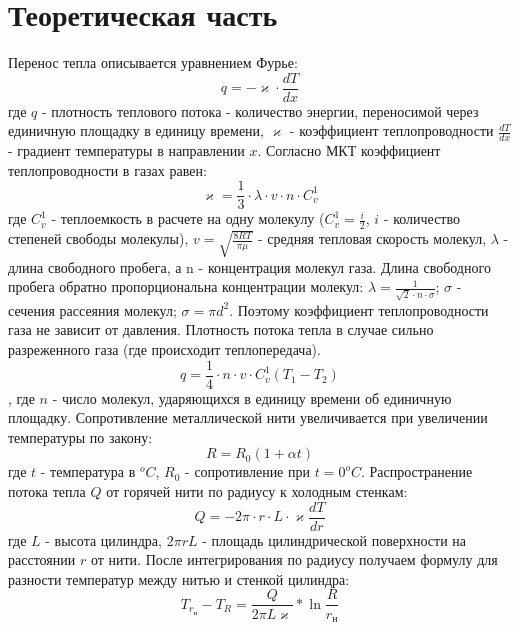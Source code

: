 \documentclass[a4paper]{article}
\begin{document}
	\section{Теоретическая часть}
	Перенос тепла описывается уравнением Фурье:
	\begin{equation}
	q=-\varkappa \cdot \frac{dT}{dx}
	\end{equation}
	где $q$ - плотность теплового потока - количество энергии, переносимой через единичную площадку в единицу времени, $\varkappa$ - коэффициент теплопроводности $\frac{dT}{dx}$ - градиент температуры в направлении $x$. Согласно МКТ коэффициент теплопроводности в газах равен:
	\begin{equation}
	\varkappa=\frac{1}{3}\cdot \lambda \cdot v \cdot n \cdot C^1_v
	\end{equation}
	где $C^1_v$ - теплоемкость в расчете на одну молекулу ($C^1_v=\frac{i}{2}$, $i$ - количество степеней свободы молекулы), $v=\sqrt{\frac{8RT}{\pi \mu}}$ - средняя тепловая скорость молекул, $\lambda$ - длина свободного пробега, а n - концентрация молекул газа. Длина свободного пробега обратно пропорциональна концентрации молекул: 
	$\lambda=\frac{1}{\sqrt{2}\cdot n \cdot \sigma}$; $\sigma$ - сечения рассеяния молекул; $\sigma=\pi d^2$. Поэтому коэффициент теплопроводности газа не зависит от давления.
	Плотность потока тепла в случае сильно разреженного газа (где происходит теплопередача).
	\begin{equation}
	q=\frac{1}{4}\cdot n \cdot v \cdot C^1_v(T_1-T_2)
	\end{equation},
	где $n$ - число молекул, ударяющихся в единицу времени об единичную площадку.
	Сопротивление металлической нити увеличивается при увеличении температуры по закону:
	\begin{equation}
	R=R_0(1 + \alpha t)
	\end{equation}
	где $t$ - температура в $^oC$, $R_0$ - сопротивление при $t=0^oC$.
	Распространение потока тепла $Q$ от горячей нити по радиусу к холодным стенкам:
	\begin{equation}
	Q=-2\pi \cdot r \cdot L \cdot \varkappa \frac{dT}{dr}
	\end{equation}
	где $L$ - высота цилиндра, $2\pi r L$ - площадь цилиндрической поверхности на расстоянии $r$ от нити. После интегрирования по радиусу получаем формулу для разности температур между нитью и стенкой цилиндра:
	\begin{equation}
	T_{r_\text{н}} - T_R=\frac{Q}{2\pi L \varkappa}*\ln\frac{R}{r_\text{н}}
	\end{equation}
\end{document}
